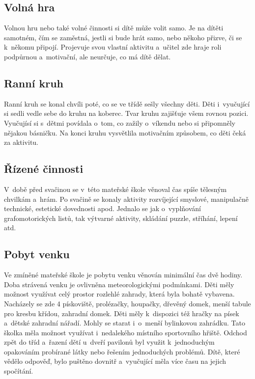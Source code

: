 		\subsection{Volná hra}

			Volnou hru nebo také volné činnosti si dítě může volit samo. Je na dítěti samotném, čím se zaměstná, jestli si bude hrát samo, nebo někoho přizve, či se k někomu připojí. Projevuje svou vlastní aktivitu a~učitel zde hraje roli podpůrnou a~motivační, ale neurčuje, co má dítě dělat. 

		\subsection{Ranní kruh}

			Ranní kruh se konal chvíli poté, co se ve třídě sešly všechny děti. Děti i~vyučující si sedli vedle sebe do kruhu na koberec. Tvar kruhu zajišťuje všem rovnou pozici. Vyučujísí si s~dětmi povídala o~tom, co zažily o~víkendu nebo si připomněly nějakou básničku. Na konci kruhu vysvětlila motivačním způsobem, co děti čeká za aktivitu. 

		\subsection{Řízené činnosti}
		 	V~době před svačinou se v~této mateřské škole věnoval čas spíše tělesným chvilkám a~hrám. Po svačině se konaly aktivity rozvíjející smyslové, manipulačně technické, estetické dovednosti apod. Jednalo se jak o~vyplňování grafomotorických listů, tak výtvarné aktivity, skládání puzzle, stříhání, lepení atd. 

		\subsection{Pobyt venku}
			Ve zmíněné mateřské škole je pobytu venku věnován minimální čas dvě hodiny. Doba strávená venku je ovlivněna meteorologickými podmínkami. Děti měly možnost využívat celý prostor rozlehlé zahrady, která byla bohatě vybavena. Nacházely se zde 4 pískoviště, prolézačky, houpačky, dřevěný domek, menší tabule pro kresbu křídou, zahradní domek. Děti měly k~dispozici též hračky na písek a~dětské zahradní nářadí. Mohly se starat i~o~menší bylinkovou zahrádku. Tato školka měla možnost využívat i~nedalekého místního sportovního hřiště. Odchod zpět do tříd a~řazení dětí u~dveří pavilonů byl využit k~jednoduchým opakováním probírané látky nebo řešením jednoduchých problémů. Dítě, které vědělo odpověď, bylo puštěno dovnitř a~vyučující měla více času na jejich spočítání.

